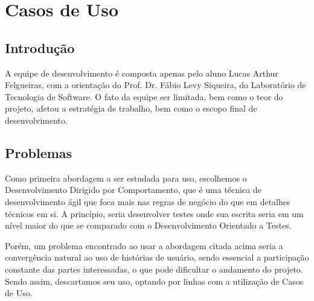 \chapter{Casos de Uso}

\section{Introdução}
A equipe de desenvolvimento é composta apenas pelo aluno Lucas Arthur Felgueiras, com a orientação do Prof. Dr. Fábio Levy Siqueira, do Laboratório de Tecnologia de Software. O fato da equipe ser limitada, bem como o teor do projeto, afetou a estratégia de trabalho, bem como o escopo final de desenvolvimento.

\section{Problemas}
Como primeira abordagem a ser estudada para uso, escolhemos o Desenvolvimento Dirigido por Comportamento, que é uma técnica de desenvolvimento ágil que foca mais nas regras de negócio do que em detalhes técnicos em si. A princípio, seria desenvolver testes onde sua escrita seria em um nível maior do que se comparado com o Desenvolvimento Orientado a Testes.
  
Porém, um problema encontrado ao usar a abordagem citada acima seria a convergência natural ao uso de histórias de usuário, sendo essencial a participação constante das partes interessadas, o que pode dificultar o andamento do projeto. Sendo assim, descartamos seu uso, optando por linhas com a utilização de Casos de Uso.
